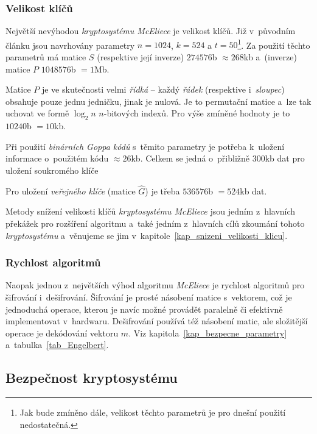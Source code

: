 \documentclass[thesis=M,czech,hidelinks]{FITthesis}[2012/06/26]
\newcommand{\0}{{\textcolor[gray]{0.75}{0}}}
\begin{document}
\subsubsection{Velikost klíčů}\label{kap_velikost_klicu}

Největší nevýhodou \emph{kryptosystému McEliece} je velikost klíčů. Již
v~původním článku jsou navrhovány parametry $n=1024$, $k=524$ a $t=50$\footnote{
    Jak bude zmíněno dále, velikost těchto parametrů je pro dnešní použití
    nedostatečná.
}. Za použití těchto parametrů má matice $S$ (respektive její inverze)
$274576$\;b $\approx 268$\;kb a~(inverze) matice $P$ $1048576$\;b $= 1$\;Mb.

Matice $P$ je ve skutečnosti velmi \emph{řídká} -- každý \emph{řádek}
(respektive i~\emph{sloupec}) obsahuje pouze jednu jedničku, jinak je nulová. Je
to permutační matice a~lze tak uchovat ve formě $\log_2 n$ $n$-bitových indexů.
Pro výše zmíněné hodnoty je to $10240$\;b $=10$\;kb.

Při použití \emph{binárních Goppa kódů} s~těmito parametry je potřeba k~uložení
informace o~použitém kódu $\approx 26$\;kb. Celkem se jedná o~přibližně
$300$\;kb dat pro uložení soukromého klíče

Pro uložení \emph{veřejného klíče} (matice $\hat{G}$) je třeba $536576$\;b
$=524$\;kb dat.

Metody snížení velikosti klíčů \emph{kryptosystému McEliece} jsou jedním
z~hlavních překážek pro rozšíření algoritmu a~také jedním z~hlavních cílů
zkoumání tohoto \emph{kryptosystému} a~věnujeme se jim
v~kapitole~\ref{kap_snizeni_velikosti_klicu}.

\subsubsection{Rychlost algoritmů}

Naopak jednou z~největších výhod algoritmu \emph{McEliece} je rychlost algoritmů
pro šifrování i~dešifrování. Šifrování je prosté násobení matice s~vektorem, což
je jednoduchá operace, kterou je navíc možné provádět paralelně či efektivně
implementovat v~hardwaru. Dešifrování používá též násobení matic, ale složitější
operace je dekódování vektoru $\hat{m}$. Viz
kapitola~\ref{kap_bezpecne_parametry} a~tabulka~\ref{tab_Engelbert}.

\subsection{Bezpečnost kryptosystému}\label{kap_bezpecnost}
\end{document}
